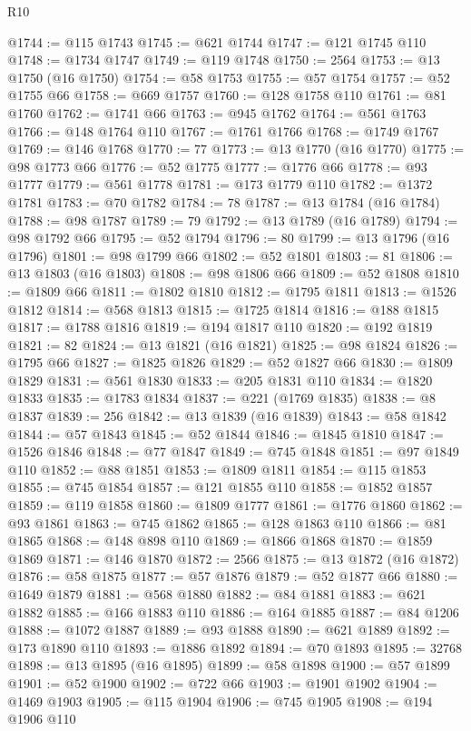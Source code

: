\begin{lexlean}{R10}
\begin{coremodule}
@1744 := @115 @1743
@1745 := @621 @1744
@1747 := @121 @1745 @110
@1748 := @1734 @1747
@1749 := @119 @1748
@1750 := 2564
@1753 := @13 @1750 (@16 @1750)
@1754 := @58 @1753
@1755 := @57 @1754
@1757 := @52 @1755 @66
@1758 := @669 @1757
@1760 := @128 @1758 @110
@1761 := @81 @1760
@1762 := @1741 @66
@1763 := @945 @1762
@1764 := @561 @1763
@1766 := @148 @1764 @110
@1767 := @1761 @1766
@1768 := @1749 @1767
@1769 := @146 @1768
@1770 := 77
@1773 := @13 @1770 (@16 @1770)
@1775 := @98 @1773 @66
@1776 := @52 @1775
@1777 := @1776 @66
@1778 := @93 @1777
@1779 := @561 @1778
@1781 := @173 @1779 @110
@1782 := @1372 @1781
@1783 := @70 @1782
@1784 := 78
@1787 := @13 @1784 (@16 @1784)
@1788 := @98 @1787
@1789 := 79
@1792 := @13 @1789 (@16 @1789)
@1794 := @98 @1792 @66
@1795 := @52 @1794
@1796 := 80
@1799 := @13 @1796 (@16 @1796)
@1801 := @98 @1799 @66
@1802 := @52 @1801
@1803 := 81
@1806 := @13 @1803 (@16 @1803)
@1808 := @98 @1806 @66
@1809 := @52 @1808
@1810 := @1809 @66
@1811 := @1802 @1810
@1812 := @1795 @1811
@1813 := @1526 @1812
@1814 := @568 @1813
@1815 := @1725 @1814
@1816 := @188 @1815
@1817 := @1788 @1816
@1819 := @194 @1817 @110
@1820 := @192 @1819
@1821 := 82
@1824 := @13 @1821 (@16 @1821)
@1825 := @98 @1824
@1826 := @1795 @66
@1827 := @1825 @1826
@1829 := @52 @1827 @66
@1830 := @1809 @1829
@1831 := @561 @1830
@1833 := @205 @1831 @110
@1834 := @1820 @1833
@1835 := @1783 @1834
@1837 := @221 (@1769 @1835)
@1838 := @8 @1837
@1839 := 256
@1842 := @13 @1839 (@16 @1839)
@1843 := @58 @1842
@1844 := @57 @1843
@1845 := @52 @1844
@1846 := @1845 @1810
@1847 := @1526 @1846
@1848 := @77 @1847
@1849 := @745 @1848
@1851 := @97 @1849 @110
@1852 := @88 @1851
@1853 := @1809 @1811
@1854 := @115 @1853
@1855 := @745 @1854
@1857 := @121 @1855 @110
@1858 := @1852 @1857
@1859 := @119 @1858
@1860 := @1809 @1777
@1861 := @1776 @1860
@1862 := @93 @1861
@1863 := @745 @1862
@1865 := @128 @1863 @110
@1866 := @81 @1865
@1868 := @148 @898 @110
@1869 := @1866 @1868
@1870 := @1859 @1869
@1871 := @146 @1870
@1872 := 2566
@1875 := @13 @1872 (@16 @1872)
@1876 := @58 @1875
@1877 := @57 @1876
@1879 := @52 @1877 @66
@1880 := @1649 @1879
@1881 := @568 @1880
@1882 := @84 @1881
@1883 := @621 @1882
@1885 := @166 @1883 @110
@1886 := @164 @1885
@1887 := @84 @1206
@1888 := @1072 @1887
@1889 := @93 @1888
@1890 := @621 @1889
@1892 := @173 @1890 @110
@1893 := @1886 @1892
@1894 := @70 @1893
@1895 := 32768
@1898 := @13 @1895 (@16 @1895)
@1899 := @58 @1898
@1900 := @57 @1899
@1901 := @52 @1900
@1902 := @722 @66
@1903 := @1901 @1902
@1904 := @1469 @1903
@1905 := @115 @1904
@1906 := @745 @1905
@1908 := @194 @1906 @110

\end{coremodule}
\end{lexlean}
